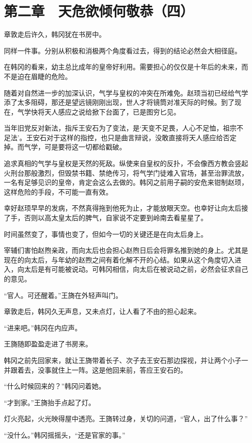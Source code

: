\section{第二章　天危欲倾何敬恭（四）}

章敦走后许久，韩冈犹在书房中。

同样一件事。分别从积极和消极两个角度看过去，得到的结论必然会大相径庭。

在韩冈的看来，幼主总比成年的皇帝好利用。需要担心的仅仅是十年后的未来，而不是迫在眉睫的危险。

随着对自然进一步的加深认识，气学与皇权的冲突在所难免。赵顼当初已经给气学添了太多阻碍，那还是望远镜刚刚出现，世人才将镜筒对准天际的时候。到了现在，气学快将天人感应之说给掀下台面了，已是图穷匕见。

当年旧党反对新法，指斥王安石为了变法，是‘天变不足畏，人心不足恤，祖宗不足法’。王安石对于这样的指控，也只是曲言辩说，没敢直接将天人感应给否定掉。而气学，可是要将这一切都给戳破。

追求真相的气学与皇权是天然的死敌。纵使来自皇权的反扑，不会像西方教会竖起火刑台那般激烈，但毁禁书籍、禁绝传习，将气学门徒难入官场，甚至治罪流放，一名有足够见识的皇帝，肯定会这么去做的。韩冈之前用子嗣的安危来钳制赵顼，这样危险的手段，不可能一直有效。

幸好赵顼早早的发病，不然真得拖到他死为止，才能放眼天空。也幸好让向太后接了手，否则以高太皇太后的脾气，自家说不定要到岭南去看星星了。

时间虽然变了，事情也变了，但如今一切的关键还是在向太后身上。

宰辅们害怕赵煦亲政，而向太后也会担心赵煦日后会将罪名推到她的身上。尤其是现在的向太后，与年幼的赵煦之间有着化解不开的心结。如果从这个角度切入进入，向太后是有可能被说动。可韩冈相信，向太后在被说动之前，必然会征求自己的意见。

“官人。可还醒着。”王旖在外轻声叫门。

章敦走后，韩冈久无声息，又未点灯，让人看了不由的担心起来。

“进来吧。”韩冈在内应声。

王旖随即盈盈走进了书房来。

韩冈之前先回家来，就让王旖带着长子、次子去王安石那边探视，并让两个小子一并跟着去，没事就住上一阵。这是他回来前，答应王安石的。

“什么时候回来的？”韩冈问着她。

“才到家。”王旖抬手点起了灯。

灯火亮起，火光映得屋中透亮。王旖转过身，关切的问道，“官人，出了什么事？”

“没什么。”韩冈摇摇头，“还是官家的事。”


